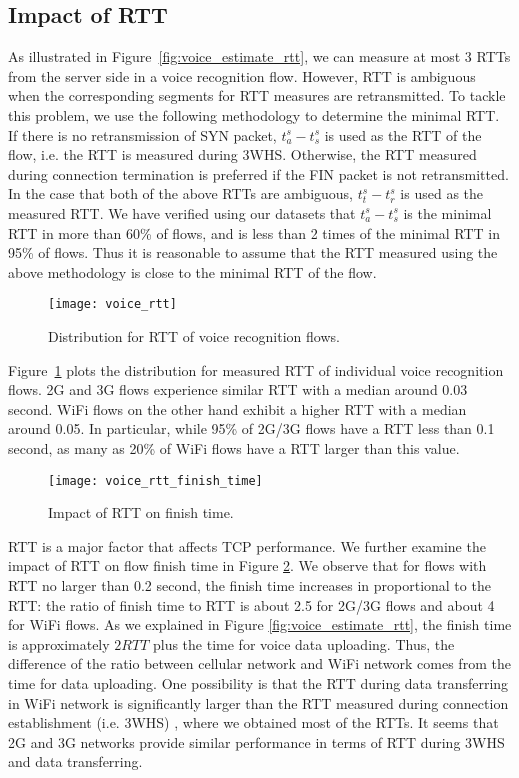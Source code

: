 \subsection{Impact of RTT}

As illustrated in Figure~\ref{fig:voice_estimate_rtt}, we can measure at most 3 RTTs from the server side in a voice recognition flow. However, RTT is ambiguous when the corresponding segments for RTT measures are retransmitted. To tackle this problem, we use the following methodology to determine the minimal RTT. If there is no retransmission of SYN packet, $t^s_a - t^s_s$ is used as the RTT of the flow, i.e. the RTT is measured during 3WHS. Otherwise, the RTT measured during connection termination is preferred if the FIN packet is not retransmitted. In the case that both of the above RTTs are ambiguous, $t^s_t - t^s_r$ is used as the measured RTT. We have verified using our datasets that $t^s_a - t^s_s$ is the minimal RTT in more than 60\% of flows, and is less than 2 times of the minimal RTT in 95\% of flows. Thus it is reasonable to assume that the RTT measured using the above methodology is close to the minimal RTT of the flow.

\begin{figure}[th]
\centering
	\texttt{[image: voice\_rtt]}
\caption{Distribution for RTT of voice recognition flows.}
\label{fig:voice_rtt}
\end{figure}

Figure~\ref{fig:voice_rtt} plots the distribution for measured RTT of individual voice recognition flows. 2G and 3G flows experience similar RTT with a median around 0.03 second. WiFi flows on the other hand exhibit a higher RTT with a median around 0.05. In particular, while 95\% of 2G/3G flows have a RTT less than 0.1 second, as many as 20\% of WiFi flows have a RTT larger than this value. 

\begin{figure}[th]
\centering
	\texttt{[image: voice\_rtt\_finish\_time]}
\caption{Impact of RTT on finish time.}
\label{fig:v_rtt_time}
\end{figure}

RTT is a major factor that affects TCP performance. We further examine the impact of RTT on flow finish time in Figure \ref{fig:v_rtt_time}. We observe that for flows with RTT no larger than 0.2 second, the finish time increases in proportional to the RTT: the ratio of finish time to RTT is about 2.5 for 2G/3G flows and about 4 for WiFi flows. As we explained in Figure \ref{fig:voice_estimate_rtt}, the finish time is approximately $2RTT$ plus the time for voice data uploading. Thus, the difference of the ratio between cellular network and WiFi network comes from the time for data uploading. One possibility is that the RTT during data transferring in WiFi network is significantly larger than the RTT measured during connection establishment (i.e. 3WHS) \cite{UM-CS-2012-022}, where we obtained most of the RTTs. It seems that 2G and 3G networks provide similar performance in terms of RTT during 3WHS and data transferring. 


